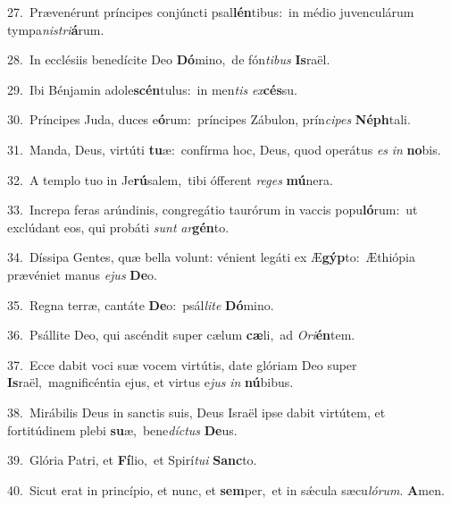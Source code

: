 {\numbfont\textcolor{\numbcolor}{27.}}~Prævenérunt príncipes conjúncti psal\-\textbf{lén}\-tibus:~\star in médio juvenculárum tympa\-\textit{nis}\-\textit{tri}\textbf{á}rum.\par
{\numbfont\textcolor{\numbcolor}{28.}}~In ecclésiis benedícite Deo \textbf{Dó}\-mino,~\star de fón\-\textit{ti}\-\textit{bus} \textbf{Is}\-raël.\par
{\numbfont\textcolor{\numbcolor}{29.}}~Ibi Bénjamin adole\-\textbf{scén}\-tulus:~\star in men\textit{tis} \textit{ex}\-\textbf{cés}su.\par
{\numbfont\textcolor{\numbcolor}{30.}}~Príncipes Juda, duces e\-\textbf{ó}\-rum:~\star príncipes Zábulon, prín\-\textit{ci}\-\textit{pes} \textbf{Néph}\-tali.\par
{\numbfont\textcolor{\numbcolor}{31.}}~Manda, Deus, virtúti \textbf{tu}\-æ:~\star confírma hoc, Deus, quod operátus \textit{es} \textit{in} \textbf{no}\-bis.\par
{\numbfont\textcolor{\numbcolor}{32.}}~A templo tuo in Je\-\textbf{rú}\-salem,~\star tibi ófferent \textit{re}\-\textit{ges} \textbf{mú}\-nera.\par
{\numbfont\textcolor{\numbcolor}{33.}}~Increpa feras arúndinis, congregátio taurórum in vaccis popu\-\textbf{ló}\-rum:~\star ut exclúdant eos, qui probáti \textit{sunt} \textit{ar}\-\textbf{gén}to.\par
{\numbfont\textcolor{\numbcolor}{34.}}~Díssipa Gentes, quæ bella volunt: vénient legáti ex Æ\-\textbf{gýp}\-to:~\star Æthiópia prævéniet manus \textit{e}\-\textit{jus} \textbf{De}\-o.\par
{\numbfont\textcolor{\numbcolor}{35.}}~Regna terræ, cantáte \textbf{De}\-o:~\star psál\-\textit{li}\-\textit{te} \textbf{Dó}\-mino.\par
{\numbfont\textcolor{\numbcolor}{36.}}~Psállite Deo, qui ascéndit super cælum \textbf{cæ}\-li,~\star ad \textit{O}\-\textit{ri}\textbf{én}tem.\par
{\numbfont\textcolor{\numbcolor}{37.}}~Ecce dabit voci suæ vocem virtútis, date glóriam Deo super \textbf{Is}\-raël,~\star magnificéntia ejus, et virtus e\textit{jus} \textit{in} \textbf{nú}\-bibus.\par
{\numbfont\textcolor{\numbcolor}{38.}}~Mirábilis Deus in sanctis suis, Deus Israël ipse dabit virtútem, et fortitúdinem plebi \textbf{su}\-æ,~\star bene\-\textit{díc}\-\textit{tus} \textbf{De}\-us.\par
{\numbfont\textcolor{\numbcolor}{39.}}~Glória Patri, et \textbf{Fí}\-lio,~\star et Spirí\-\textit{tu}\-\textit{i} \textbf{Sanc}\-to.\par
{\numbfont\textcolor{\numbcolor}{40.}}~Sicut erat in princípio, et nunc, et \textbf{sem}\-per,~\star et in sǽcula sæcu\-\textit{ló}\-\textit{rum}. \textbf{A}\-men.\par
